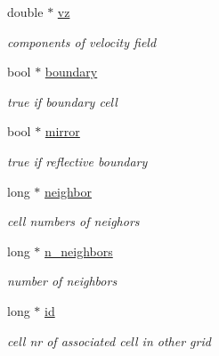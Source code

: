 \begin{DoxyCompactItemize}
double $\ast$ \mbox{\hyperlink{structCELLS_a5bbea38ec85a172bc1819a6d3aef4ff7}{vz}}
\begin{DoxyCompactList}\small\item\em components of velocity field \end{DoxyCompactList}\item 
\mbox{\label{structCELLS_a04496a360d3e29065d8a61a81da90f9f}} 
bool $\ast$ \mbox{\hyperlink{structCELLS_a04496a360d3e29065d8a61a81da90f9f}{boundary}}
\begin{DoxyCompactList}\small\item\em true if boundary cell \end{DoxyCompactList}\item 
\mbox{\label{structCELLS_a1c40d2d73b81aee2de6d74064f4d32d1}} 
bool $\ast$ \mbox{\hyperlink{structCELLS_a1c40d2d73b81aee2de6d74064f4d32d1}{mirror}}
\begin{DoxyCompactList}\small\item\em true if reflective boundary \end{DoxyCompactList}\item 
\mbox{\label{structCELLS_a47d6e0ed045d94afe0eddefe58fd5f5c}} 
long $\ast$ \mbox{\hyperlink{structCELLS_a47d6e0ed045d94afe0eddefe58fd5f5c}{neighbor}}
\begin{DoxyCompactList}\small\item\em cell numbers of neighors \end{DoxyCompactList}\item 
\mbox{\label{structCELLS_a2ac51bb380e31381da381c26981cee1f}} 
long $\ast$ \mbox{\hyperlink{structCELLS_a2ac51bb380e31381da381c26981cee1f}{n\+\_\+neighbors}}
\begin{DoxyCompactList}\small\item\em number of neighbors \end{DoxyCompactList}\item 
\mbox{\label{structCELLS_a24fdc09b67570b3c0e8e2afd07ff6cdc}} 
long $\ast$ \mbox{\hyperlink{structCELLS_a24fdc09b67570b3c0e8e2afd07ff6cdc}{id}}
\begin{DoxyCompactList}\small\item\em cell nr of associated cell in other grid \end{DoxyCompactList}\item 

\end{DoxyCompactItemize}
